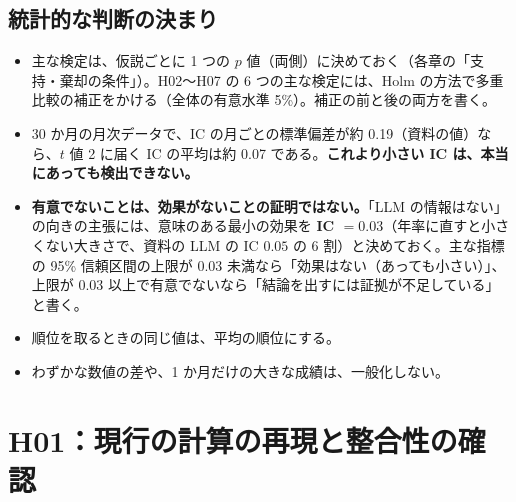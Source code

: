 \documentclass[xelatex,ja=standard,jafont=haranoaji,a4paper,10pt,openany]{bxjsreport}
\begin{document}
\section{統計的な判断の決まり}

\begin{itemize}
\item 主な検定は、仮説ごとに 1 つの $p$ 値（両側）に決めておく（各章の「支持・棄却の条件」）。H02〜H07 の 6 つの主な検定には、Holm の方法で多重比較の補正をかける（全体の有意水準 5\%）。補正の前と後の両方を書く。
\item 30 か月の月次データで、IC の月ごとの標準偏差が約 0.19（資料の値）なら、$t$ 値 2 に届く IC の平均は約 0.07 である。\textbf{これより小さい IC は、本当にあっても検出できない。}
\item \textbf{有意でないことは、効果がないことの証明ではない。}「LLM の情報はない」の向きの主張には、意味のある最小の効果を \textbf{IC $=0.03$}（年率に直すと小さくない大きさで、資料の LLM の IC $0.05$ の 6 割）と決めておく。主な指標の 95\% 信頼区間の上限が 0.03 未満なら「効果はない（あっても小さい）」、上限が 0.03 以上で有意でないなら「結論を出すには証拠が不足している」と書く。
\item 順位を取るときの同じ値は、平均の順位にする。
\item わずかな数値の差や、1 か月だけの大きな成績は、一般化しない。
\end{itemize}

\chapter{H01：現行の計算の再現と整合性の確認}\label{ch:h01}
\end{document}
